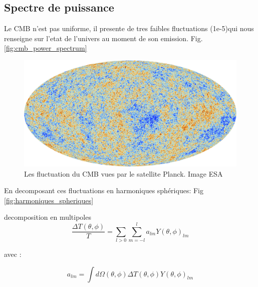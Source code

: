 \subsection{Spectre de puissance}

Le CMB n'est pas uniforme, il presente de tres faibles fluctuations (1e-5)qui nous renseigne sur l'etat de l'univers au moment de son emission.
Fig. \ref{fig:cmb_power_spectrum}

\begin{figure}[bth]
        \includegraphics[width=.95\linewidth]{img/01/CMB.jpeg} 
        \caption{Les fluctuation du CMB vues par le satellite Planck. 
        Image ESA}
 		\label{fig:cmb}
\end{figure}


En decomposant ces fluctuations en harmoniques sphériques:
Fig\,\ref{fig:harmoniques_spheriques}

decomposition en multipoles
\begin{equation}
 \frac{\Delta T(\theta,\phi)}{T} = \sum_{l>0} \sum_{m=-l}^l a_{lm} Y(\theta,\phi)_{lm}
\end{equation}

avec : 

\begin{equation}
a_{lm}= \int d\Omega(\theta,\phi) \Delta T (\theta,\phi) Y(\theta,\phi)_{lm}
\end{equation}


